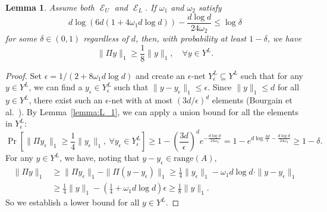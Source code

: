 \documentclass[11pt]{article}
\newtheorem{lemma}{Lemma}
\DeclareMathOperator{\E}{\mathcal{E}}
\begin{document}
\begin{lemma}
  \label{lemma:L_all}
  Assume both $\E_U$ and $\E_{L}$.
  If $\omega_1$ and $\omega_2$ satisfy
  \begin{equation*}
    d \log \left( 6 d ( 1 + 4 \omega_1 d \log d) \right) 
    - \frac{d \log d}{24 \omega_2} \leq \log \delta
  \end{equation*}
  for some $\delta \in (0, 1)$ regardless of $d$, then, with probability at
  least $1-\delta$, we have
  \begin{equation*}
    \|\Pi y\|_1 \geq \frac{1}{8} \|y\|_1, \quad \forall y \in Y^L.
  \end{equation*}
\end{lemma}
\begin{proof}
  Set $\epsilon = 1/(2+8 \omega_1 d \log d)$ and create an $\epsilon$-net
  $Y^L_\epsilon \subseteq Y^L$ such that for any $y \in Y^L$, we can find a
  $y_\epsilon \in Y^L_\epsilon$ such that $\|y - y_\epsilon\|_1 \leq \epsilon$.
  Since $\|y\|_1 \leq d$ for all $y \in Y^L$, there exist such an $\epsilon$-net
  with at most $(3 d/\epsilon)^d$ elements (Bourgain et al.~\cite{BLM89}).
  By Lemma~\ref{lemma:L_1}, we can apply a union bound for all the elements in
  $Y^L_\epsilon$:
  \begin{equation*}
    \Pr[\|\Pi y_\epsilon\|_1 
    \geq \frac{1}{4} \|y_\epsilon\|_1,\ \forall y_\epsilon \in Y^L_\epsilon] 
    \geq 1 - \left( \frac{3 d}{\epsilon} \right)^d e^{-\frac{d \log d}{24 \omega_2}} 
    = 1 - e^{d \log \frac{3d}{\epsilon} - \frac{d \log d}{24 \omega_2}} \geq 1 - \delta.
  \end{equation*}
  For any $y \in Y^L$, we have, noting that $y-y_\epsilon \in \text{range}(A)$,
  \begin{align*}
    \|\Pi y\|_1 &\geq \|\Pi y_\epsilon\|_1 - \|\Pi (y-y_\epsilon)\|_1 
    \geq \frac{1}{4} \|y_\epsilon\|_1 - \omega_1 d \log d \cdot \|y - y_\epsilon\|_1 \\
    &\geq \frac{1}{4} \|y\|_1 - \left( \frac{1}{4} + \omega_1 d \log d
    \right) \epsilon \geq \frac{1}{8} \|y\|_1.
  \end{align*}
  So we establish a lower bound for all $y \in Y^L$.
\end{proof}
\end{document}
